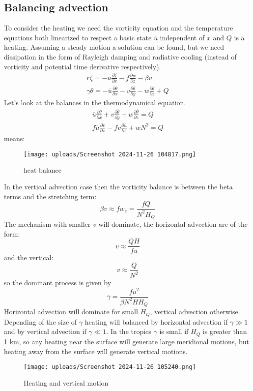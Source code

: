 \subsection{Balancing advection}
To consider the heating we need the vorticity equation and the temperature equations both linearized to respect a basic state $\overline{u}$ independent of $x$ and $Q$ is a heating. Assuming a steady motion a solution can be found, but we need dissipation in the form of Rayleigh damping and radiative cooling (instead of vorticity and potential time derivative respectively).
\begin{align}
	r\zeta=-\overline{u}\frac{\partial\zeta}{\partial x}-f\frac{\partial w}{\partial z}-\beta v \\
	\gamma\theta=-\overline{u}\frac{\partial\theta}{\partial x}-v\frac{\partial\overline{\theta}}{\partial y}-w\frac{\partial\theta}{\partial z}+Q
\end{align}
Let's look at the balances in the thermodynamical equation.
\begin{align}
	\overline{u}\frac{\partial\theta}{\partial x}+{v}\frac{\partial\overline{\theta}}{\partial y}+w\frac{\partial\overline{\theta}}{\partial z}=Q \\
	f\overline{u}\frac{\partial v}{\partial x}-f{v}\frac{\partial\overline{u}}{\partial z}+wN^2=Q
\end{align}
means:
\begin{figure}[htp!]
	\centering
	\texttt{[image: uploads/Screenshot 2024-11-26 104817.png]}
	\caption{heat balance}
\end{figure}

In the vertical advection case then the vorticity balance is between the beta terms and the stretching term:
$$\beta v\approx fw_z=\frac{fQ}{N^2H_Q}$$
The mechanism with smaller $v$ will dominate, the horizontal advection are of the form:
$$v\approx\frac{QH}{f\overline{u}}$$
and the vertical:
$$v\approx\frac{Q}{N^2}$$
so the dominant process is given by
\begin{equation}
	\gamma=\frac{f\overline{u}^2}{\beta N^2HH_Q}
\end{equation}
Horizontal advection will dominate for small $H_Q$, vertical
advection otherwise. Depending of the size of $\gamma$ heating will balanced by horizontal advection if $\gamma \gg 1$ and by vertical advection if $\gamma\ll 1$.
In the tropics $\gamma$ is small if $H_Q$ is greater than 1 km, so any heating near the surface will generate large meridional motions, but heating away from the surface will generate vertical motions.
\begin{figure}[htp!]
	\centering
	\texttt{[image: uploads/Screenshot 2024-11-26 105240.png]}
	\caption{Heating and vertical motion}

\end{figure}


